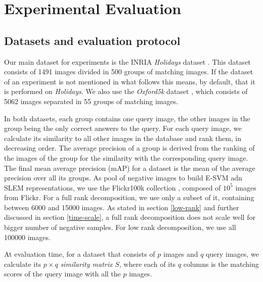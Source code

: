 \section{Experimental Evaluation}
\label{eval}

\subsection{Datasets and evaluation protocol} \label{eval:protocol}
Our main dataset for experiments is the INRIA \emph{Holidays} dataset \cite{holidays}. This dataset consists of 1491 images divided in 500 groups of matching images. If the dataset of an experiment is not mentioned in what follows this means, by default, that it is performed on \emph{Holidays}.
We also use  the \emph{Oxford5k} dataset \cite{oxford}, which consists of 5062 images separated in 55 groups of matching images.

In both datasets, each group contains one query image, the other images in the group being the only correct answers to the query.
For each query image, we calculate its similarity to all other images in the database and rank them, in decreasing order.
The average precision of a group is derived from the ranking of the images of the group for the similarity with the corresponding query image.
The final mean average precision (mAP) for a dataset is the mean of the average precision over all its groups.
As pool of negative images to build E-SVM adn SLEM representations, we use the Flickr100k collection \cite{oxford}, composed of $10^5$ images from Flickr. For a full rank decomposition, we use only a subset of it, containing between 6000 and 15000 images.
As stated in section \ref{low-rank} and further discussed in section \ref{time-scale}, a full rank decomposition does not scale well for bigger number of negative samples. For low rank decomposition, we use all 100000 images.

At evaluation time, for a dataset that consists of $p$ images and $q$ query images, we calculate its $p\times q$ \emph{similarity matrix} $S$, where each of its $q$ columns is the matching scores of the query image with all the $p$ images.


